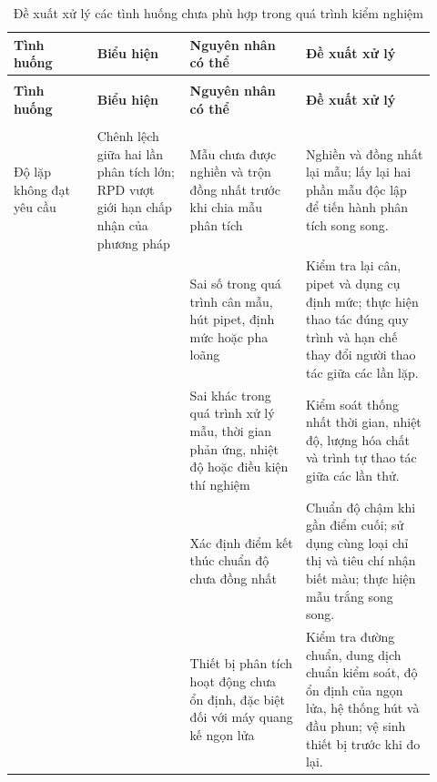 \begin{landscape}
\begingroup
\footnotesize
\setlength{\tabcolsep}{4pt}
\renewcommand{\arraystretch}{1.18}

\begin{longtable}{|>{\raggedright\arraybackslash}p{0.18\linewidth}|>{\raggedright\arraybackslash}p{0.20\linewidth}|>{\raggedright\arraybackslash}p{0.25\linewidth}|>{\raggedright\arraybackslash}p{0.29\linewidth}|}
\caption{Đề xuất xử lý các tình huống chưa phù hợp trong quá trình kiểm nghiệm}\label{tab:de-xuat-xu-ly-ket-qua} \\
\hline
\textbf{Tình huống} & \textbf{Biểu hiện} & \textbf{Nguyên nhân có thể} & \textbf{Đề xuất xử lý} \\
\hline
\endfirsthead

\multicolumn{4}{c}{\tablename~\thetable{} -- tiếp theo} \\
\hline
\textbf{Tình huống} & \textbf{Biểu hiện} & \textbf{Nguyên nhân có thể} & \textbf{Đề xuất xử lý} \\
\hline
\endhead

\hline
\multicolumn{4}{r}{\textit{Còn tiếp trang sau}} \\
\endfoot

\hline
\endlastfoot

Độ lặp không đạt yêu cầu
& Chênh lệch giữa hai lần phân tích lớn; RPD vượt giới hạn chấp nhận của phương pháp
& Mẫu chưa được nghiền và trộn đồng nhất trước khi chia mẫu phân tích
& Nghiền và đồng nhất lại mẫu; lấy lại hai phần mẫu độc lập để tiến hành phân tích song song. \\
\hline

&
& Sai số trong quá trình cân mẫu, hút pipet, định mức hoặc pha loãng
& Kiểm tra lại cân, pipet và dụng cụ định mức; thực hiện thao tác đúng quy trình và hạn chế thay đổi người thao tác giữa các lần lặp. \\
\hline

&
& Sai khác trong quá trình xử lý mẫu, thời gian phản ứng, nhiệt độ hoặc điều kiện thí nghiệm
& Kiểm soát thống nhất thời gian, nhiệt độ, lượng hóa chất và trình tự thao tác giữa các lần thử. \\
\hline

&
& Xác định điểm kết thúc chuẩn độ chưa đồng nhất
& Chuẩn độ chậm khi gần điểm cuối; sử dụng cùng loại chỉ thị và tiêu chí nhận biết màu; thực hiện mẫu trắng song song. \\
\hline

&
& Thiết bị phân tích hoạt động chưa ổn định, đặc biệt đối với máy quang kế ngọn lửa
& Kiểm tra đường chuẩn, dung dịch chuẩn kiểm soát, độ ổn định của ngọn lửa, hệ thống hút và đầu phun; vệ sinh thiết bị trước khi đo lại. \\
\hline


\end{longtable}
\end{landscape}
